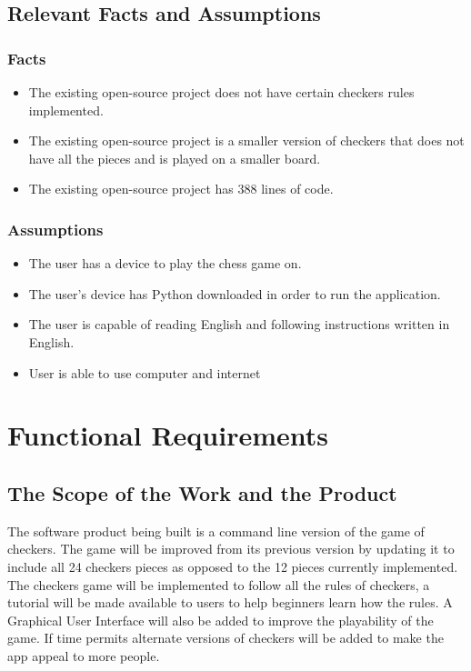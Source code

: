 \documentclass[12pt, titlepage]{article}
\begin{document}
\subsection{Relevant Facts and Assumptions}
\subsubsection{Facts}
\begin{itemize}
    \item The existing open-source project does not have certain checkers rules implemented.
    \item The existing open-source project is a smaller version of checkers that does not have all the pieces and is played on a smaller board.
    \item The existing open-source project has 388 lines of code.
\end{itemize}
\subsubsection{Assumptions}
\begin{itemize}
    \item The user has a device to play the chess game on.
    \item The user's device has Python downloaded in order to run the application.
    \item The user is capable of reading English and following instructions written in English.
    \item User is able to use computer and internet
\end{itemize}

\section{Functional Requirements}

\subsection{The Scope of the Work and the Product}
The software product being built is a command line version of the game of checkers. The game will be improved from its previous version by updating it to include all 24 checkers pieces as opposed to the 12 pieces currently implemented. The checkers game will be implemented to follow all the rules of checkers, a tutorial will be made available to users to help beginners learn how the rules. A Graphical User Interface will also be added to improve the playability of the game. If time permits alternate versions of checkers will be added to make the app appeal to more people.
\end{document}
